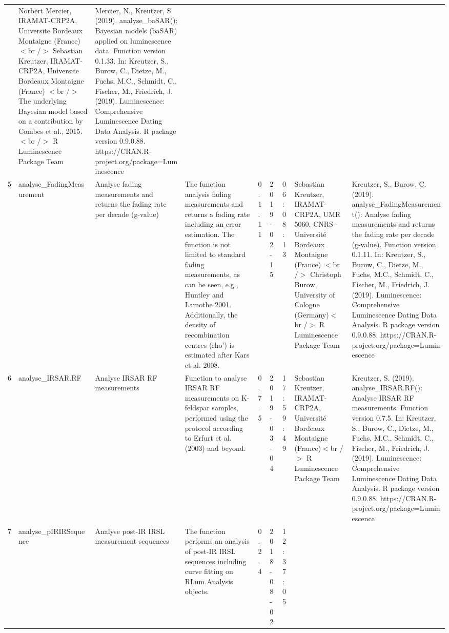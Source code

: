 \begin{table}[ht]
\begin{tabular}{rllllllll}
 & Norbert Mercier, IRAMAT-CRP2A, Universite Bordeaux Montaigne (France)  $<$br /$>$ Sebastian Kreutzer, IRAMAT-CRP2A, Universite Bordeaux Montaigne (France)  $<$br /$>$ The underlying Bayesian model based on a contribution by Combes et al., 2015.$<$br /$>$  R Luminescence Package Team & Mercier, N., Kreutzer, S. (2019). analyse\_baSAR(): Bayesian models (baSAR) applied on luminescence data. Function version 0.1.33. In: Kreutzer, S., Burow, C., Dietze, M., Fuchs, M.C., Schmidt, C., Fischer, M., Friedrich, J. (2019). Luminescence: Comprehensive Luminescence Dating Data Analysis. R package version 0.9.0.88. https://CRAN.R-project.org/package=Luminescence
 \\ 
  5 & analyse\_FadingMeasurement & Analyse fading measurements and returns the fading rate per decade (g-value) & The function analysis fading measurements and returns a fading rate including an error estimation. The function is not limited to standard fading measurements, as can be seen, e.g., Huntley and Lamothe 2001. Additionally, the density of recombination centres (rho') is estimated after Kars et al. 2008. & 0.1.11 & 2019-02-15 & 06:08:13
 & Sebastian Kreutzer, IRAMAT-CRP2A, UMR 5060, CNRS - Université Bordeaux Montaigne (France)  $<$br /$>$ Christoph Burow, University of Cologne (Germany)$<$br /$>$  R Luminescence Package Team & Kreutzer, S., Burow, C. (2019). analyse\_FadingMeasurement(): Analyse fading measurements and returns the fading rate per decade (g-value). Function version 0.1.11. In: Kreutzer, S., Burow, C., Dietze, M., Fuchs, M.C., Schmidt, C., Fischer, M., Friedrich, J. (2019). Luminescence: Comprehensive Luminescence Dating Data Analysis. R package version 0.9.0.88. https://CRAN.R-project.org/package=Luminescence
 \\ 
  6 & analyse\_IRSAR.RF & Analyse IRSAR RF measurements & Function to analyse IRSAR RF measurements on K-feldspar samples, performed using the protocol according to Erfurt et al. (2003) and beyond. & 0.7.5 & 2019-03-04 & 17:59:49
 & Sebastian Kreutzer, IRAMAT-CRP2A, Université Bordeaux Montaigne (France)$<$br /$>$  R Luminescence Package Team & Kreutzer, S. (2019). analyse\_IRSAR.RF(): Analyse IRSAR RF measurements. Function version 0.7.5. In: Kreutzer, S., Burow, C., Dietze, M., Fuchs, M.C., Schmidt, C., Fischer, M., Friedrich, J. (2019). Luminescence: Comprehensive Luminescence Dating Data Analysis. R package version 0.9.0.88. https://CRAN.R-project.org/package=Luminescence
 \\ 
  7 & analyse\_pIRIRSequence & Analyse post-IR IRSL measurement sequences & The function performs an analysis of post-IR IRSL sequences including curve fitting on  RLum.Analysis  objects. & 0.2.4 & 2018-08-02 & 12:37:05

\end{tabular}
\end{table}
